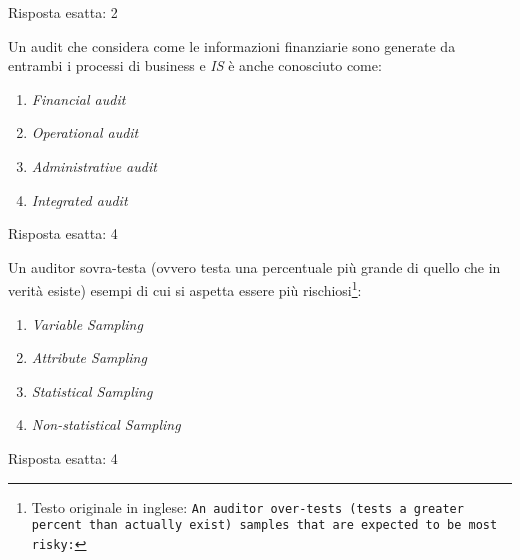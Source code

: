 \begin{Answer} [
  ref={audit5},
  number={5}
  ]

  \Question Risposta esatta: 2

\end{Answer}


\begin{Exercise} [
  title={Quiz},
  label={audit6}
  ]

  \Question Un audit che considera come le informazioni finanziarie sono 
generate da entrambi i processi di business e \textit{IS} è anche conosciuto 
come:
\begin{enumerate}
 \item \textit{Financial audit}
 \item \textit{Operational audit}
 \item \textit{Administrative audit}
 \item \textit{Integrated audit}
\end{enumerate}

\end{Exercise}


\begin{Answer} [
  ref={audit6},
  number={6}
  ]

  \Question Risposta esatta: 4

\end{Answer}

\begin{Exercise} [
  title={Quiz},
  label={audit7}
  ]

  \Question Un auditor sovra-testa (ovvero testa una percentuale più grande di 
quello che in verità esiste) esempi di cui si aspetta essere più 
rischiosi\footnote{Testo originale in inglese: \texttt{An auditor over-tests 
(tests a greater percent than actually exist) samples that are expected to be 
most risky:}}:
\begin{enumerate}
 \item \textit{Variable Sampling}
 \item \textit{Attribute Sampling}
 \item \textit{Statistical Sampling}
 \item \textit{Non-statistical Sampling}
\end{enumerate}

\end{Exercise}


\begin{Answer} [
  ref={audit7},
  number={7}
  ]

  \Question Risposta esatta: 4

\end{Answer}


